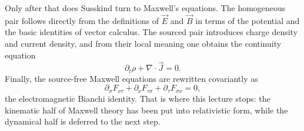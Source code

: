 Only after that does Susskind turn to Maxwell's equations. The homogeneous pair follows directly from the definitions of $\vec E$ and $\vec B$ in terms of the potential and the basic identities of vector calculus. The sourced pair introduces charge density and current density, and from their local meaning one obtains the continuity equation
\begin{equation}
\partial_t\rho+\nabla\cdot\vec J=0.
\end{equation}
Finally, the source-free Maxwell equations are rewritten covariantly as
\begin{equation}
\partial_\sigma F_{\nu\tau}
+\partial_\nu F_{\tau\sigma}
+\partial_\tau F_{\sigma\nu}
=0,
\end{equation}
the electromagnetic Bianchi identity. That is where this lecture stops: the kinematic half of Maxwell theory has been put into relativistic form, while the dynamical half is deferred to the next step.